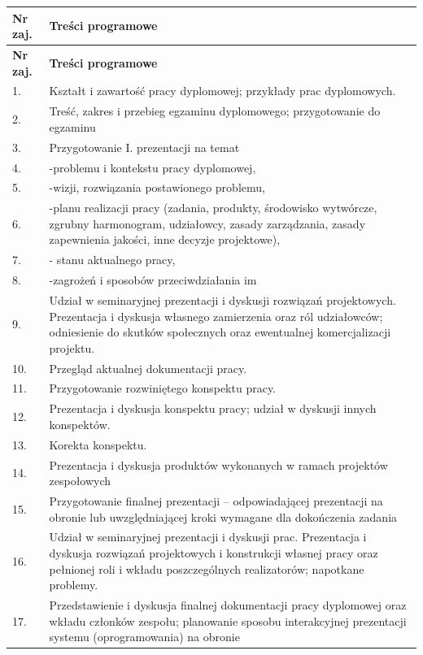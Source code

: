 \documentclass[12pt, a4paper]{article}
\newcommand{\thdrule}{\noalign{\global\setlength{\extrarowheight}{0pt}}}
\newcommand{\thdend}{\noalign{\global\setlength{\extrarowheight}{3pt}}}
\begin{document}
{\scriptsize
\begin{longtable}{m{1.5cm}m{14.5cm}}
\thdrule\toprule
\rowcolor{pjatkRed} {\color{white}\textbf{Nr zaj.}} & {\color{white}\textbf{Treści programowe}} \\
\midrule\thdend
\endfirsthead
\thdrule\toprule
\rowcolor{pjatkRed} {\color{white}\textbf{Nr zaj.}} & {\color{white}\textbf{Treści programowe}} \\
\midrule\thdend
\endhead
  \rowcolor{tableRowLight} 1. & Kształt i zawartość pracy dyplomowej; przykłady prac dyplomowych. \\
  \rowcolor{tableRowAlt} 2. & Treść, zakres i przebieg egzaminu dyplomowego; przygotowanie do egzaminu \\
  \rowcolor{tableRowLight} 3. & Przygotowanie I. prezentacji na temat \\
  \rowcolor{tableRowAlt} 4. & -problemu i kontekstu pracy dyplomowej, \\
  \rowcolor{tableRowLight} 5. & -wizji, rozwiązania postawionego problemu, \\
  \rowcolor{tableRowAlt} 6. & -planu realizacji pracy (zadania, produkty, środowisko wytwórcze, zgrubny harmonogram, udziałowcy, zasady zarządzania, zasady zapewnienia jakości, inne decyzje projektowe), \\
  \rowcolor{tableRowLight} 7. & - stanu aktualnego pracy, \\
  \rowcolor{tableRowAlt} 8. & -zagrożeń i sposobów przeciwdziałania im \\
  \rowcolor{tableRowLight} 9. & Udział w seminaryjnej prezentacji i dyskusji rozwiązań projektowych. Prezentacja i dyskusja własnego zamierzenia oraz ról udziałowców; odniesienie do skutków społecznych oraz ewentualnej komercjalizacji projektu. \\
  \rowcolor{tableRowAlt} 10. & Przegląd aktualnej dokumentacji pracy. \\
  \rowcolor{tableRowLight} 11. & Przygotowanie rozwiniętego konspektu pracy. \\
  \rowcolor{tableRowAlt} 12. & Prezentacja i dyskusja konspektu pracy; udział w dyskusji innych konspektów. \\
  \rowcolor{tableRowLight} 13. & Korekta konspektu. \\
  \rowcolor{tableRowAlt} 14. & Prezentacja i dyskusja produktów wykonanych w ramach projektów zespołowych \\
  \rowcolor{tableRowLight} 15. & Przygotowanie finalnej prezentacji – odpowiadającej prezentacji na obronie lub uwzględniającej kroki wymagane dla dokończenia zadania \\
  \rowcolor{tableRowAlt} 16. & Udział w seminaryjnej prezentacji i dyskusji prac. Prezentacja i dyskusja rozwiązań projektowych i konstrukcji własnej pracy oraz pełnionej roli i wkładu poszczególnych realizatorów; napotkane problemy. \\
  \rowcolor{tableRowLight} 17. & Przedstawienie i dyskusja finalnej dokumentacji pracy dyplomowej oraz wkładu członków zespołu; planowanie sposobu interakcyjnej prezentacji systemu (oprogramowania) na obronie \\
\bottomrule
\end{longtable}}
\end{document}
